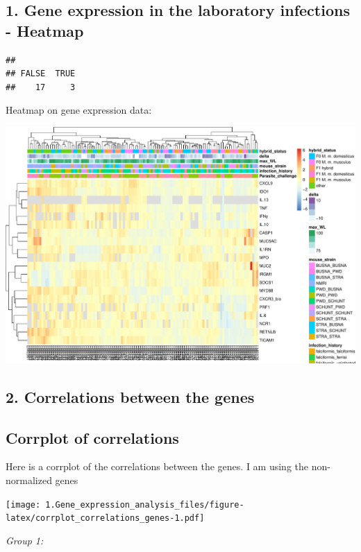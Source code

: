 \documentclass[
]{article}
\begin{document}
\hypertarget{gene-expression-in-the-laboratory-infections---heatmap}{%
\subsection{1. Gene expression in the laboratory infections -
Heatmap}\label{gene-expression-in-the-laboratory-infections---heatmap}}

\begin{verbatim}
## 
## FALSE  TRUE 
##    17     3
\end{verbatim}

Heatmap on gene expression data:

\includegraphics{1.Gene_expression_analysis_files/figure-latex/pheatmap_genes-1.pdf}

\hypertarget{correlations-between-the-genes}{%
\subsection{2. Correlations between the
genes}\label{correlations-between-the-genes}}

\hypertarget{corrplot-of-correlations}{%
\subsection{Corrplot of correlations}\label{corrplot-of-correlations}}

Here is a corrplot of the correlations between the genes. I am using the
non-normalized genes

\texttt{[image: 1.Gene\_expression\_analysis\_files/figure-latex/corrplot\_correlations\_genes-1.pdf]}

\emph{Group 1:}
\end{document}
